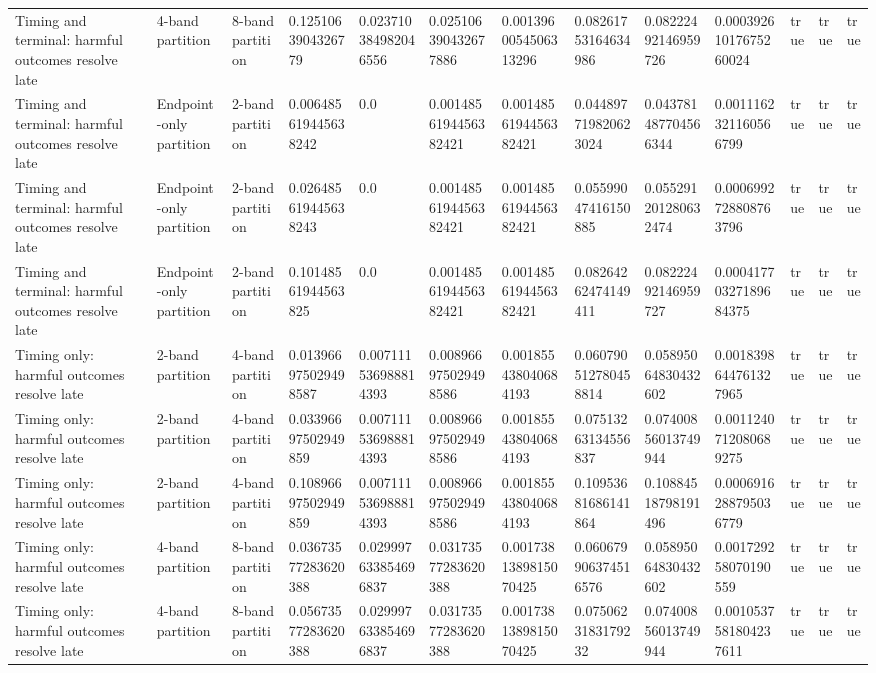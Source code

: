 \begin{tabular}{lllllllllllll}
Timing and terminal: harmful outcomes resolve late & 4-band partition & 8-band partition & 0.1251063904326779 & 0.023710384982046556 & 0.025106390432677886 & 0.0013960054506313296 & 0.08261753164634986 & 0.08222492146959726 & 0.00039261017675260024 & true & true & true \\
Timing and terminal: harmful outcomes resolve late & Endpoint-only partition & 2-band partition & 0.006485619445638242 & 0.0 & 0.0014856194456382421 & 0.0014856194456382421 & 0.044897719820623024 & 0.043781487704566344 & 0.0011162321160566799 & true & true & true \\
Timing and terminal: harmful outcomes resolve late & Endpoint-only partition & 2-band partition & 0.026485619445638243 & 0.0 & 0.0014856194456382421 & 0.0014856194456382421 & 0.05599047416150885 & 0.055291201280632474 & 0.0006992728808763796 & true & true & true \\
Timing and terminal: harmful outcomes resolve late & Endpoint-only partition & 2-band partition & 0.10148561944563825 & 0.0 & 0.0014856194456382421 & 0.0014856194456382421 & 0.08264262474149411 & 0.08222492146959727 & 0.00041770327189684375 & true & true & true \\
Timing only: harmful outcomes resolve late & 2-band partition & 4-band partition & 0.013966975029498587 & 0.007111536988814393 & 0.008966975029498586 & 0.001855438040684193 & 0.060790512780458814 & 0.05895064830432602 & 0.0018398644761327965 & true & true & true \\
Timing only: harmful outcomes resolve late & 2-band partition & 4-band partition & 0.03396697502949859 & 0.007111536988814393 & 0.008966975029498586 & 0.001855438040684193 & 0.07513263134556837 & 0.07400856013749944 & 0.0011240712080689275 & true & true & true \\
Timing only: harmful outcomes resolve late & 2-band partition & 4-band partition & 0.10896697502949859 & 0.007111536988814393 & 0.008966975029498586 & 0.001855438040684193 & 0.10953681686141864 & 0.10884518798191496 & 0.0006916288795036779 & true & true & true \\
Timing only: harmful outcomes resolve late & 4-band partition & 8-band partition & 0.03673577283620388 & 0.029997633854696837 & 0.03173577283620388 & 0.0017381389815070425 & 0.060679906374516576 & 0.05895064830432602 & 0.001729258070190559 & true & true & true \\
Timing only: harmful outcomes resolve late & 4-band partition & 8-band partition & 0.05673577283620388 & 0.029997633854696837 & 0.03173577283620388 & 0.0017381389815070425 & 0.0750623183179232 & 0.07400856013749944 & 0.0010537581804237611 & true & true & true \\

\end{tabular}
